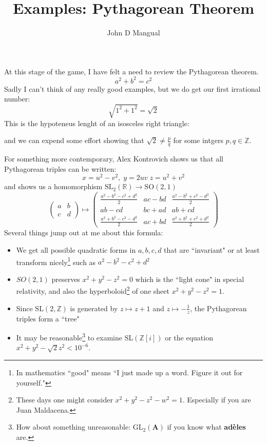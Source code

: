\documentclass[12pt]{article}
\title{\textbf{ Examples:  Pythagorean Theorem }}
\author{John D Mangual}
\date{}
\begin{document}
\selectfont \fontsize{25}{30}\selectfont

\maketitle

\noindent At this stage of the game, I have felt a need to review the Pythagorean theorem.  
$$ a^2 + b^2 = c^2 $$
Sadly I can't think of any really good examples, but we do get our first irrational number:
$$ \sqrt{1^2 + 1^2 } = \sqrt{2}$$
This is the hypoteneus lenght of an isosceles right triangle:
\begin{center}
\end{center}
and we can expend some effort showing that $\sqrt{2} \neq \frac{p}{q}$ for some intgers $p, q \in \mathbb{Z}$.
\newpage

\noindent For something more contemporary, Alex Kontrovich shows us that all Pythagorean triples can be written:
$$ x = u^2 - v^2, \; y = 2uv\; z = u^2 + v^2 $$
and shows us a homomorphism $\text{SL}_2(\mathbb{R}) \to \text{SO}(2,1) $
$$ \left( \begin{array}{cc} 
a & b \\ c & d\end{array}\right) 
\mapsto 
\left( \begin{array}{ccc} 
\frac{a^2 - b^2 - c^2 + d^2}{2} & ac -bd & 
\frac{a^2 - b^2 + c^2 - d^2}{2} \\
ab - cd & bc + ad & ab + cd \\
\frac{a^2 + b^2 - c^2 - d^2}{2} & 
ac + bd & \frac{a^2 + b^2 + c^2 + d^2}{2}
\end{array}\right)$$
Several things jump out at me about this formula:
\begin{itemize}
\item We get all possible quadratic forms in $a,b,c,d$ that are ``invariant" or at least transform nicely\footnote{In mathematics ``good" means ``I just made up a word.  Figure it out for yourself."} such as $a^2 - b^2 - c^2 + d^2$
\item $SO(2,1)$ preserves $x^2 +y^2 - z^2=0$ which is the ``light cone" in special relativity, and also the hyperboloid\footnote{These days one might consider $x^2 +y^2 - z^2 - w^2 = 1$.  Especially if you are Juan Maldacena.} of one sheet $x^2 + y^2 - z^2 = 1$.
\item Since $\text{SL}(2, \mathbb{Z})$ is generated by $z \mapsto z+1$ and $z \mapsto - \frac{1}{z}$, the Pythagorean triples form a ``tree"
\item It may be reasonable\footnote{How about something unreasonable: $\text{GL}_2(\mathbf{A})$ if you know what \textbf{ad\`{e}les}  are.} to examine $\text{SL}(\mathbb{Z}[i])$ or the equation $x^2 + y^2 - \sqrt{2}z^2 < 10^{-6}$.
\end{itemize}
\end{document}
